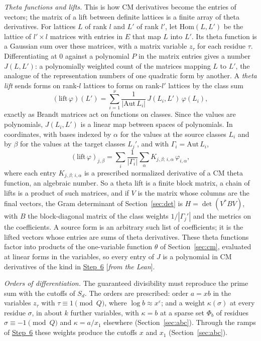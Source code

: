 \documentclass[11pt]{amsart}
\numberwithin{equation}{section}
\theoremstyle{definition}
\theoremstyle{remark}
\newcommand{\status}[1]{\textup{[\emph{#1}]}}
\begin{document}
\emph{Theta functions and lifts.} This is how CM derivatives become the entries of vectors; the matrix of a lift between definite lattices is a finite array of theta derivatives. For lattices $L$ of rank $l$ and $L'$ of rank $l'$, let $\mathrm{Hom}(L,L')$ be the lattice of $l'\times l$ matrices with entries in $E$ that map $L$ into $L'$. Its theta function is a Gaussian sum over these matrices, with a matrix variable $z_\tau$ for each residue $\tau$. Differentiating at $0$ against a polynomial $P$ in the matrix entries gives a number $J(L,L')$: a polynomially weighted count of the matrices mapping $L$ to $L'$, the analogue of the representation numbers of one quadratic form by another. A \emph{theta lift} sends forms on rank-$l$ lattices to forms on rank-$l'$ lattices by the class sum
\begin{equation}
 (\mathrm{lift}\,\varphi)(L')=\sum_{i=1}^\nu\frac1{|\mathrm{Aut}\,L_i|}\,J(L_i,L')\,\varphi(L_i),
\end{equation}
exactly as Brandt matrices act on functions on classes. Since the values are polynomials, $J(L_i,L')$ is a linear map between spaces of polynomials. In coordinates, with bases indexed by $\alpha$ for the values at the source classes $L_i$ and by $\beta$ for the values at the target classes $L_j'$, and with $\Gamma_i=\mathrm{Aut}\,L_i$,
\begin{equation}\label{eq:blocklift}
 (\mathrm{lift}\,\varphi)_{j,\beta}=\sum_i\frac1{|\Gamma_i|}\sum_\alpha K_{j,\beta;\,i,\alpha}\,\varphi_{i,\alpha},
\end{equation}
where each entry $K_{j,\beta;\,i,\alpha}$ is a prescribed normalized derivative of a CM theta function, an algebraic number. So a theta lift is a finite block matrix, a chain of lifts is a product of such matrices, and if $V$ is the matrix whose columns are the final vectors, the Gram determinant of Section~\ref{sec:det} is $H=\det(V^*BV)$, with $B$ the block-diagonal matrix of the class weights $1/|\Gamma_j'|$ and the metrics on the coefficients. A source form is an arbitrary such list of coefficients; it is the lifted vectors whose entries are sums of theta derivatives. These theta functions factor into products of the one-variable function $\theta$ of Section~\ref{sec:cm}, evaluated at linear forms in the variables, so every entry of $J$ is a polynomial in CM derivatives of the kind in \hyperref[step:6]{Step~6} \status{from the Lean}.

\emph{Orders of differentiation.} The guaranteed divisibility must reproduce the prime sum with the cutoffs of $S_d$. The orders are prescribed: order $a=xb$ in the variables $z_\tau$ with $\tau\equiv1\pmod Q$, where $\log b\approx x^\varepsilon$; and a weight $\kappa(\sigma)$ at every residue $\sigma$, in about $k$ further variables, with $\kappa=b$ at a sparse set $\Phi_b$ of residues $\sigma\equiv-1\pmod Q$ and $\kappa=a/x_1$ elsewhere (Section~\ref{sec:abc}). Through the ramps of \hyperref[step:6]{Step~6} these weights produce the cutoffs $x$ and $x_1$ (Section~\ref{sec:abc}).
\end{document}
